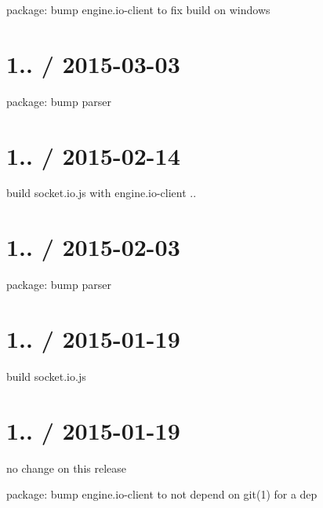 \begin{DoxyItemize}
\item package\+: bump {\ttfamily engine.\+io-\/client} to fix build on windows
\end{DoxyItemize}

\section*{1.. / 2015-\/03-\/03 }


\begin{DoxyItemize}
\item package\+: bump parser
\end{DoxyItemize}

\section*{1.. / 2015-\/02-\/14 }


\begin{DoxyItemize}
\item build {\ttfamily socket.\+io.\+js} with {\ttfamily engine.\+io-\/client} {..}
\end{DoxyItemize}

\section*{1.. / 2015-\/02-\/03 }


\begin{DoxyItemize}
\item package\+: bump parser
\end{DoxyItemize}

\section*{1.. / 2015-\/01-\/19 }


\begin{DoxyItemize}
\item build {\ttfamily socket.\+io.\+js}
\end{DoxyItemize}

\section*{1.. / 2015-\/01-\/19 }


\begin{DoxyItemize}
\item no change on this release
\item package\+: bump {\ttfamily engine.\+io-\/client} to not depend on {\ttfamily git(1)} for a dep
\end{DoxyItemize}

